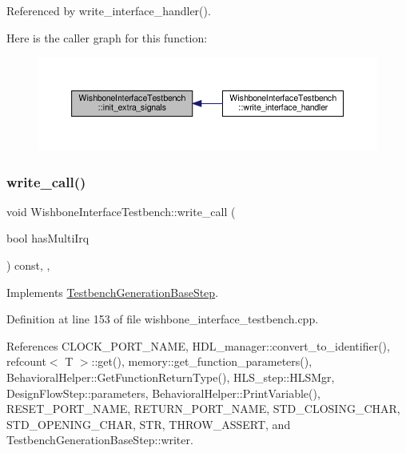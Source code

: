 Referenced by write\+\_\+interface\+\_\+handler().

Here is the caller graph for this function\+:
\nopagebreak
\begin{figure}[H]
\begin{center}
\leavevmode
\includegraphics[width=350pt]{de/ded/classWishboneInterfaceTestbench_ab6123ce32d28cf46681575d10c293158_icgraph}
\end{center}
\end{figure}
\mbox{\label{classWishboneInterfaceTestbench_a6e234d950e3b63e52ab206e23b68531e}} 
\subsubsection{\texorpdfstring{write\+\_\+call()}{write\_call()}}
{\footnotesize\ttfamily void Wishbone\+Interface\+Testbench\+::write\+\_\+call (\begin{DoxyParamCaption}\item[{bool}]{has\+Multi\+Irq }\end{DoxyParamCaption}) const\hspace{0.3cm}{\ttfamily [override]}, {\ttfamily [protected]}, {\ttfamily [virtual]}}



Implements \hyperlink{classTestbenchGenerationBaseStep_a07a88446a9b569d6776e8d20ea323809}{Testbench\+Generation\+Base\+Step}.



Definition at line 153 of file wishbone\+\_\+interface\+\_\+testbench.\+cpp.



References C\+L\+O\+C\+K\+\_\+\+P\+O\+R\+T\+\_\+\+N\+A\+ME, H\+D\+L\+\_\+manager\+::convert\+\_\+to\+\_\+identifier(), refcount$<$ T $>$\+::get(), memory\+::get\+\_\+function\+\_\+parameters(), Behavioral\+Helper\+::\+Get\+Function\+Return\+Type(), H\+L\+S\+\_\+step\+::\+H\+L\+S\+Mgr, Design\+Flow\+Step\+::parameters, Behavioral\+Helper\+::\+Print\+Variable(), R\+E\+S\+E\+T\+\_\+\+P\+O\+R\+T\+\_\+\+N\+A\+ME, R\+E\+T\+U\+R\+N\+\_\+\+P\+O\+R\+T\+\_\+\+N\+A\+ME, S\+T\+D\+\_\+\+C\+L\+O\+S\+I\+N\+G\+\_\+\+C\+H\+AR, S\+T\+D\+\_\+\+O\+P\+E\+N\+I\+N\+G\+\_\+\+C\+H\+AR, S\+TR, T\+H\+R\+O\+W\+\_\+\+A\+S\+S\+E\+RT, and Testbench\+Generation\+Base\+Step\+::writer.

